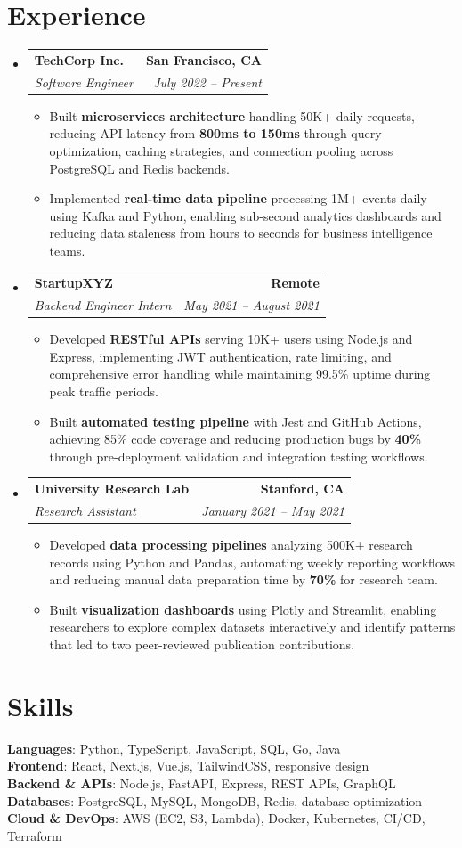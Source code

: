 \documentclass[letterpaper,10pt]{article}
\makeatletter
\newcommand{\resumeItem}[1]{\item\small{{#1 \vspace{-2pt}}}}
\newcommand{\resumeSubheading}[4]{\vspace{-1pt}\item\begin{tabular*}{1.0\textwidth}[t]{l@{\extracolsep{\fill}}r}\textbf{#1} & \textbf{\small #2} \\\textit{\small#3} & \textit{\small #4} \\\end{tabular*}\vspace{-2pt}}
\newcommand{\resumeSubHeadingListStart}{\begin{itemize}[leftmargin=0.0in, label={}]}
\newcommand{\resumeSubHeadingListEnd}{\end{itemize}}
\newcommand{\resumeItemListStart}{\begin{itemize}[leftmargin=0.15in,label=\textbullet,itemsep=2pt,topsep=0pt,parsep=0pt,partopsep=0pt]}
\newcommand{\resumeItemListEnd}{\end{itemize}\vspace{-4pt}}
\makeatother
\begin{document}
\section{Experience}
\resumeSubHeadingListStart
\resumeSubheading{TechCorp Inc.}{San Francisco, CA}{Software Engineer}{July 2022 -- Present}
\resumeItemListStart
\resumeItem{Built \textbf{microservices architecture} handling 50K+ daily requests, reducing API latency from \textbf{800ms to 150ms} through query optimization, caching strategies, and connection pooling across PostgreSQL and Redis backends.}
\resumeItem{Implemented \textbf{real-time data pipeline} processing 1M+ events daily using Kafka and Python, enabling sub-second analytics dashboards and reducing data staleness from hours to seconds for business intelligence teams.}
\resumeItemListEnd
\resumeSubheading{StartupXYZ}{Remote}{Backend Engineer Intern}{May 2021 -- August 2021}
\resumeItemListStart
\resumeItem{Developed \textbf{RESTful APIs} serving 10K+ users using Node.js and Express, implementing JWT authentication, rate limiting, and comprehensive error handling while maintaining 99.5\% uptime during peak traffic periods.}
\resumeItem{Built \textbf{automated testing pipeline} with Jest and GitHub Actions, achieving 85\% code coverage and reducing production bugs by \textbf{40\%} through pre-deployment validation and integration testing workflows.}
\resumeItemListEnd
\resumeSubheading{University Research Lab}{Stanford, CA}{Research Assistant}{January 2021 -- May 2021}
\resumeItemListStart
\resumeItem{Developed \textbf{data processing pipelines} analyzing 500K+ research records using Python and Pandas, automating weekly reporting workflows and reducing manual data preparation time by \textbf{70\%} for research team.}
\resumeItem{Built \textbf{visualization dashboards} using Plotly and Streamlit, enabling researchers to explore complex datasets interactively and identify patterns that led to two peer-reviewed publication contributions.}
\resumeItemListEnd
\resumeSubHeadingListEnd
\vspace{-6pt}
\section{Skills}
\begin{itemize}[leftmargin=0.15in, label={}]
\small{\item{
\textbf{Languages}: Python, TypeScript, JavaScript, SQL, Go, Java \\
\textbf{Frontend}: React, Next.js, Vue.js, TailwindCSS, responsive design \\
\textbf{Backend \& APIs}: Node.js, FastAPI, Express, REST APIs, GraphQL \\
\textbf{Databases}: PostgreSQL, MySQL, MongoDB, Redis, database optimization \\
\textbf{Cloud \& DevOps}: AWS (EC2, S3, Lambda), Docker, Kubernetes, CI/CD, Terraform
}}
\end{itemize}
\vspace{-6pt}
\end{document}
